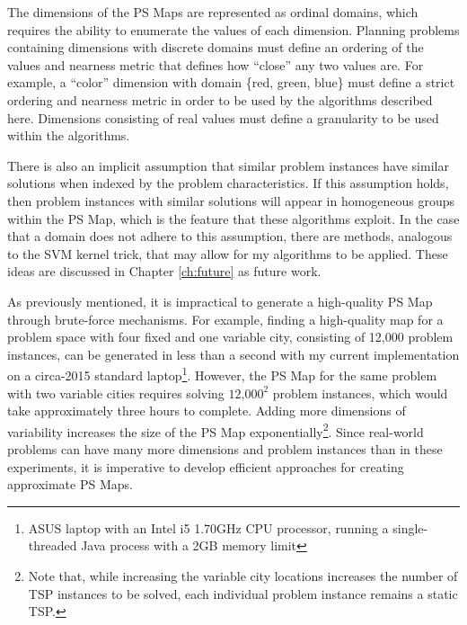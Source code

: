 The dimensions of the PS Maps are represented as ordinal domains, which requires the ability to enumerate the values of each dimension.  Planning problems containing dimensions with discrete domains must define an ordering of the values and nearness metric that defines how ``close'' any two values are.  For example, a ``color'' dimension with domain \{red, green, blue\} must define a strict ordering and nearness metric in order to be used by the algorithms described here.  Dimensions consisting of real values must define a granularity to be used within the algorithms.

There is also an implicit assumption that similar problem instances have similar solutions when indexed by the problem characteristics.  If this assumption holds, then problem instances with similar solutions will appear in homogeneous groups within the PS Map, which is the feature that these algorithms exploit. In the case that a domain does not adhere to this assumption, there are methods, analogous to the SVM kernel trick, that may allow for my algorithms to be applied.  These ideas are discussed in Chapter \ref{ch:future}  as future work.


As previously mentioned, it is impractical to generate a high-quality PS Map through brute-force mechanisms.  For example, finding a high-quality map for a problem space with four fixed and one variable city, consisting of 12,000 problem instances, can be generated in less than a second with my current implementation on a circa-2015 standard laptop\footnote{ASUS laptop with an Intel i5 1.70GHz CPU processor, running a single-threaded Java process with a 2GB memory limit}.  However, the PS Map for the same problem with two variable cities requires solving $\textrm{12,000}^{\textrm{2}}$ problem instances, which would take approximately three hours to complete.    Adding more dimensions of variability increases the size of the PS Map exponentially\footnote{Note that, while increasing the variable city locations increases the number of TSP instances to be solved, each individual problem instance remains a static TSP.}.  Since real-world problems can have many more dimensions and problem instances than in these experiments, it is imperative to develop efficient approaches for creating approximate PS Maps.



